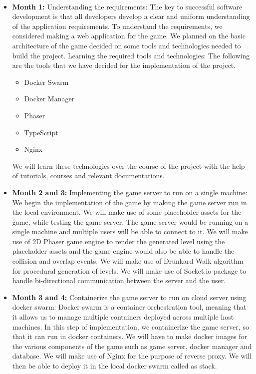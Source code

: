 \documentclass[oneside,12pt]{Classes/VTU}
\begin{document}
	\paragraph{}
	\begin{itemize}
		\item \textbf{Month 1: }Understanding the requirements: 
		The key to successful software development is that all developers develop a clear and uniform understanding of the application requirements. To understand the requirements, we considered making a web application for the game. We planned on the basic architecture of the game decided on some tools and technologies needed to build the project. \newline
		Learning the required tools and technologies: The following are the tools that we have decided for the implementation of the project. 
		\begin{itemize}
			\item Docker Swarm
			\item Docker Manager
			\item Phaser
			\item TypeScript
			\item Nginx
		\end{itemize}
		We will learn these technologies over the course of the project with the help of tutorials, courses and relevant documentations. 
		
		\item \textbf{Month 2 and 3: }Implementing the game server to run on a single machine: 
		We begin the implementation of the game by making the game server run in the local environment. We will make use of some placeholder assets for the game, while testing the game server. The game server would be running on a single machine and multiple users will be able to connect to it. We will make use of 2D Phaser game engine to render the generated level using the placeholder assets and the game engine would also be able to handle the collision and overlap events. We will make use of Drunkard Walk algorithm for procedural generation of levels. We will make use of Socket.io package to handle bi-directional communication between the server and the user.
		
		
		\item \textbf{Month 3 and 4: }Containerize the game server to run on cloud server using docker swarm: 
		Docker swarm is a container orchestration tool, meaning that it allows us to manage multiple containers deployed across multiple host machines. In this step of implementation, we containerize the game server, so that it can run in docker containers. We will have to make docker images for the various components of the game such as game server, docker manager and database. We will make use of Nginx for the purpose of reverse proxy. We will then be able to deploy it in the local docker swarm called as stack.
		

\end{itemize}
\end{document}

